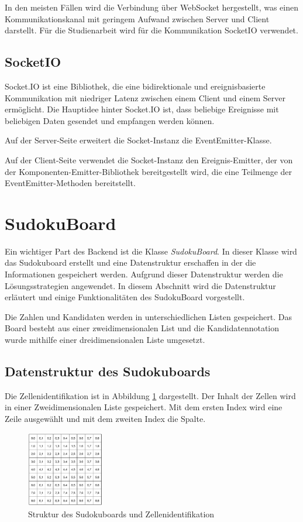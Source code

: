 In den meisten Fällen wird die Verbindung über WebSocket hergestellt, was einen Kommunikationskanal mit geringem Aufwand zwischen Server und Client darstellt. Für die Studienarbeit wird für die Kommunikation SocketIO verwendet. 

\subsection{SocketIO}

Socket.IO ist eine Bibliothek, die eine bidirektionale und ereignisbasierte Kommunikation mit niedriger Latenz zwischen einem Client und einem Server ermöglicht. Die Hauptidee hinter Socket.IO ist, dass beliebige Ereignisse mit beliebigen Daten gesendet und empfangen werden können.

Auf der Server-Seite erweitert die Socket-Instanz die EventEmitter-Klasse.

Auf der Client-Seite verwendet die Socket-Instanz den Ereignis-Emitter, der von der Komponenten-Emitter-Bibliothek bereitgestellt wird, die eine Teilmenge der EventEmitter-Methoden bereitstellt.

\section{SudokuBoard}

Ein wichtiger Part des Backend ist die Klasse \textit{SudokuBoard}. In dieser Klasse wird das Sudokuboard erstellt und eine Datenstruktur erschaffen in der die Informationen gespeichert werden. Aufgrund dieser Datenstruktur werden die Lösungsstrategien angewendet. In diesem Abschnitt wird die Datenstruktur erläutert und einige Funktionalitäten des SudokuBoard vorgestellt.

Die Zahlen und Kandidaten werden in unterschiedlichen Listen gespeichert. Das Board besteht aus einer zweidimensionalen List und die Kandidatennotation wurde mithilfe einer dreidimensionalen Liste umgesetzt. 

\subsection{Datenstruktur des Sudokuboards}
Die Zellenidentifikation ist in Abbildung \ref{fig:Sudokugitter} dargestellt. Der Inhalt der Zellen wird in einer Zweidimensionalen Liste gespeichert. Mit dem ersten Index wird eine Zeile ausgewählt und mit dem zweiten Index die Spalte. 

\begin{figure}[htbp]
	\centering
	\includegraphics[width=0.3\textwidth]{images/board.png}
	\caption{Struktur des Sudokuboards und Zellenidentifikation \cite{zambon2015sudoku}}
	\label{fig:Sudokugitter}
\end{figure}

